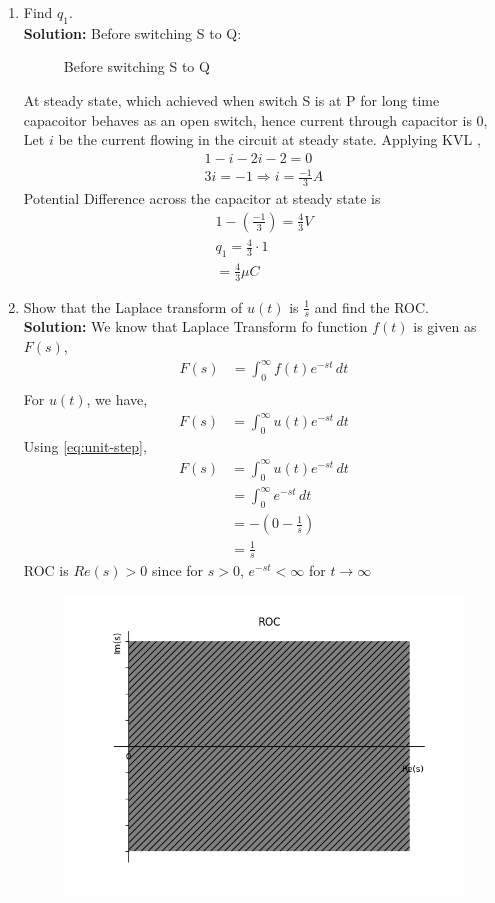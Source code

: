 \documentclass[journal,12pt,twocolumn]{IEEEtran}
\newcommand{\solution}{\noindent \textbf{Solution: }}
\providecommand{\brak}[1]{\ensuremath{\left(#1\right)}}
\numberwithin{equation}{section}
\renewcommand\thesection{\arabic{section}}
\begin{document}
\begin{enumerate}[label=\arabic*.,ref=\thesection.\theenumi]
\item Find $q_1$.\\
\solution
Before switching S to Q:
\begin{figure}
  
\caption{Before switching S to Q}
\end{figure}
At steady state, which achieved when switch S is at P for long time capacoitor behaves as an open switch, hence current through capacitor is $0$,
Let $i$ be the current flowing in the circuit at steady state. Applying KVL ,
\begin{align}
1-i-2i-2=0\\
3i=-1 \Rightarrow i=\frac{-1}{3}A
\end{align}
Potential Difference across the capacitor at steady state is
\begin{align}
1-\brak{\frac{-1}{3}}=\frac{4}{3}V\\
q_1=\frac{4}{3} \cdot 1\\
=\frac{4}{3} \mu C
\end{align}
	\item Show that the Laplace transform of $u(t)$ is $\frac{1}{s}$ and find the ROC.\\
	\solution We know that Laplace Transform fo function $f(t)$ is given as $F(s)$,
	\begin{align}
		\label{eq:LaplaceTrans}
	F(s)&= \int_{0}^{\infty} f(t)e^{-st} \,dt \\
\end{align}
For $u(t)$, we have,
\begin{align}
	F(s)&=\int_{0}^{\infty} u(t)e^{-st} \,dt
\end{align}
	Using \eqref{eq:unit-step},
	\begin{align}
	F(s)&=\int_{0}^{\infty} u(t)e^{-st} \,dt\\
	&=\int_{0}^{\infty} e^{-st} \,dt\\
	&=-\brak{0-\frac{1}{s}}\\
	&=\frac{1}{s}
	\end{align}
	ROC is $ Re(s)>0$ since for $s>0$, $e^{-st}<\infty$ for $t \to \infty$
	\begin{figure}[!ht]
			\centering
			\includegraphics[width=\columnwidth]{figs/2.4}

\end{figure}
\end{enumerate}
\end{document}
